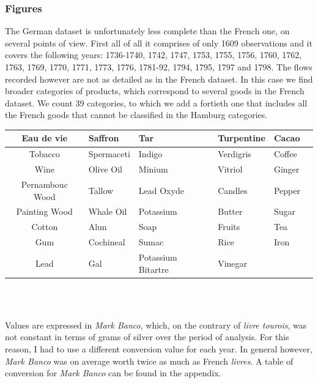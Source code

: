 \documentclass[12pt,a4paper,titlepage,english]{article}
\begin{document}
\subsubsection{Figures}
The German dataset is unfortunately less complete than the French one, on several points of view. First all of all it comprises of only 1609 observations and it covers the following years: 1736-1740, 1742, 1747, 1753, 1755, 1756, 1760, 1762, 1763, 1769, 1770, 1771, 1773, 1776, 1781-92, 1794, 1795, 1797 and 1798. The flows recorded however are not as detailed as in the French dataset. In this case we find broader categories of products, which correspond to several goods in the French dataset. We count 39 categories, to which we add a fortieth one that includes all the French goods that cannot be classified in the Hamburg categories. 
\begin{center}
 \label{tab:title} 
\begin{tabularx}{1\textwidth}{|c *{5}{|Y}|}
\hline
	Eau de vie & Saffron & Tar & Turpentine & Cacao \\ \hline
	Tobacco & Spermaceti & Indigo & Verdigris & Coffee \\ \hline
	Wine & Olive Oil & Minium  & Vitriol & Ginger \\ \hline
	Pernambouc Wood & Tallow & Lead Oxyde & Candles & Pepper \\ \hline
	Painting Wood & Whale Oil & Potassium & Butter & Sugar \\ \hline
	Cotton & Alun & Soap & Fruits & Tea \\ \hline
	Gum & Cochineal & Sumac & Rice & Iron \\ \hline
	Lead & Gal & Potassium Bitartre & Vinegar & \  \\ \hline
\end{tabularx}\\~\\
\end{center}

Values are expressed in \textit{Mark Banco}, which, on the contrary of \textit{livre tourois}, was not constant in terms of grams of silver over the period of analysis. For this reason, I had to use a different conversion value for each year. In general however, \textit{Mark Banco} was on average worth twice as much as French \textit{livres}. A table of conversion for \textit{Mark Banco} can be found in the appendix. \\
\end{document}
